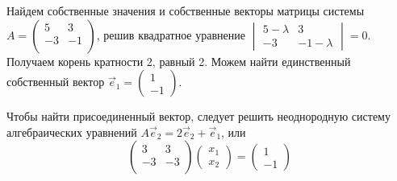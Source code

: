 \begin{solution}
Найдем собственные значения и собственные векторы матрицы системы  
$A=\begin{pmatrix}
5 & 3 \\
-3 & -1 \\
\end{pmatrix}$, решив квадратное уравнение 
$
\begin{vmatrix}
5-\lambda & 3 \\
-3 & -1-\lambda
\end{vmatrix} = 0 
$.
Получаем корень кратности 2, равный 2. Можем найти единственный собственный вектор  $\vec{e}_1=\begin{pmatrix}
1 \\
-1
\end{pmatrix}$.


Чтобы найти присоединенный вектор, следует решить неоднородную систему алгебраических уравнений $A\vec{e}_2=2\vec{e}_2+\vec{e}_1$, или
\[
\begin{pmatrix}
3 & 3 \\
-3 & -3 \\
\end{pmatrix} 
\begin{pmatrix}
x_1 \\
x_2
\end{pmatrix} =
\begin{pmatrix}
1 \\
-1
\end{pmatrix}
\]



\end{solution}
